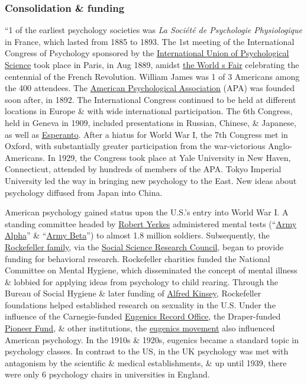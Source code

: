 \documentclass[oneside]{book}
\numberwithin{equation}{section}
\begin{document}
\subsubsection{Consolidation \& funding}
``1 of the earliest psychology societies was \textit{La Soci\'et\'e de Psychologie Physiologique} in France, which lasted from 1885 to 1893. The 1st meeting of the International Congress of Psychology sponsored by the \href{https://en.wikipedia.org/wiki/International_Union_of_Psychological_Science}{International Union of Psychological Science} took place in Paris, in Aug 1889, amidst \href{https://en.wikipedia.org/wiki/Exposition_Universelle_(1889)}{the World
s Fair} celebrating the centennial of the French Revolution. William James was 1 of 3 Americans among the 400 attendees. The \href{https://en.wikipedia.org/wiki/American_Psychological_Association}{American Psychological Association} (APA) was founded soon after, in 1892. The International Congress continued to be held at different locations in Europe \& with wide international participation. The 6th Congress, held in Geneva in 1909, included presentations in Russian, Chinese, \& Japanese, as well as \href{https://en.wikipedia.org/wiki/Esperanto}{Esperanto}. After a hiatus for World War I, the 7th Congress met in Oxford, with substantially greater participation from the war-victorious Anglo-Americans. In 1929, the Congress took place at Yale University in New Haven, Connecticut, attended by hundreds of members of the APA. Tokyo Imperial University led the way in bringing new psychology to the East. New ideas about psychology diffused from Japan into China.

American psychology gained status upon the U.S.'s entry into World War I. A standing committee headed by \href{https://en.wikipedia.org/wiki/Robert_Yerkes}{Robert Yerkes} administered mental tests (``\href{https://en.wikipedia.org/wiki/Army_Alpha}{Army Alpha}'' \& ``\href{https://en.wikipedia.org/wiki/Army_Beta}{Army Beta}'') to almost 1.8 million soldiers. Subsequently, the \href{https://en.wikipedia.org/wiki/Rockefeller_family}{Rockefeller family}, via the \href{https://en.wikipedia.org/wiki/Social_Science_Research_Council}{Social Science Research Council}, began to provide funding for behavioral research. Rockefeller charities funded the National Committee on Mental Hygiene, which disseminated the concept of mental illness \& lobbied for applying ideas from psychology to child rearing. Through the Bureau of Social Hygiene \& later funding of \href{https://en.wikipedia.org/wiki/Alfred_Kinsey}{Alfred Kinsey}, Rockefeller foundations helped established research on sexuality in the U.S. Under the influence of the Carnegie-funded \href{https://en.wikipedia.org/wiki/Eugenics_Record_Office}{Eugenics Record Office}, the Draper-funded \href{https://en.wikipedia.org/wiki/Pioneer_Fund}{Pioneer Fund}, \& other institutions, the \href{https://en.wikipedia.org/wiki/Eugenics_in_the_United_States}{eugenics movement} also influenced American psychology. In the 1910s \& 1920s, eugenics became a standard topic in psychology classes. In contrast to the US, in the UK psychology was met with antagonism by the scientific \& medical establishments, \& up until 1939, there were only 6 psychology chairs in universities in England.
\end{document}
